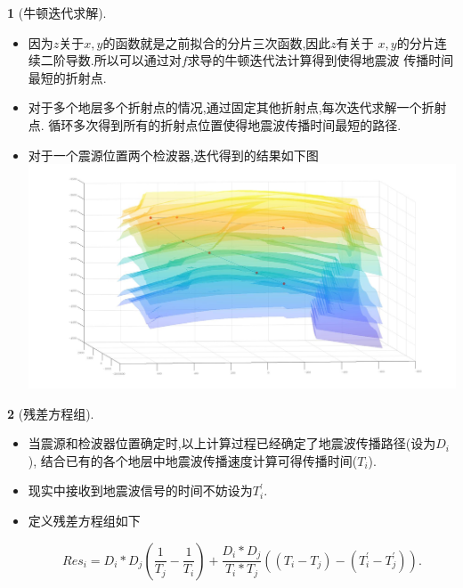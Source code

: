 \documentclass[UTF8]{ctexbeamer}	%
\theoremstyle{plain}
\theoremstyle{definition}
\newtheorem{emt}{}[section]
\theoremstyle{remark}
\numberwithin{equation}{section}
\begin{document}
\begin{frame}
  \begin{emt}[牛顿迭代求解]
      \begin{itemize}
          \item 因为$z$关于$x,y$的函数就是之前拟合的分片三次函数,因此$z$有关于
          $x,y$的分片连续二阶导数.所以可以通过对$f$求导的牛顿迭代法计算得到使得地震波
          传播时间最短的折射点.

          \item 对于多个地层多个折射点的情况,通过固定其他折射点,每次迭代求解一个折射点.
          循环多次得到所有的折射点位置使得地震波传播时间最短的路径.

          \item 对于一个震源位置两个检波器,迭代得到的结果如下图
          \includegraphics[width = .6\textwidth]{fig/s2p4.jpg}
      \end{itemize}
  \end{emt}
\end{frame}

\begin{frame}
\begin{emt}[残差方程组]
    \begin{itemize}
        \item 当震源和检波器位置确定时,以上计算过程已经确定了地震波传播路径(设为$D_i$),
        结合已有的各个地层中地震波传播速度计算可得传播时间($T_i$).
        \item 现实中接收到地震波信号的时间不妨设为$T_i^\prime$.
        \item 定义残差方程组如下
        \begin{small}
            \begin{equation}
                Res_i = D_i * D_j(\frac{1}{T_j} - \frac{1}{T_i}) + \frac{D_i * D_j}{T_i * T_j}((T_i - T_j) 
                 - (T_i^\prime - T_j^\prime)).
            \end{equation}
        \end{small}
    \end{itemize}
\end{emt}
\end{frame}
\end{document}
